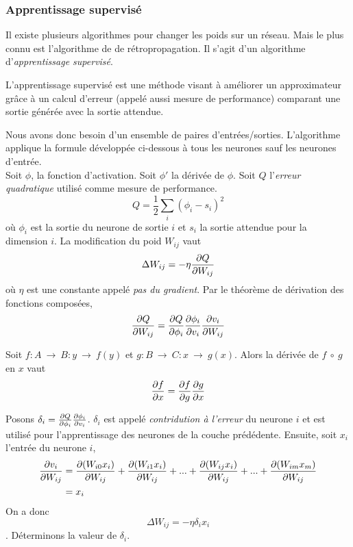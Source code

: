 \subsubsection{Apprentissage supervisé}\label{sec:appmlp}
Il existe plusieurs algorithmes pour changer les poids sur un réseau. Mais le plus connu est l'algorithme de de rétropropagation.\cite{Haykin,Gauthier}
Il s'agit d'un algorithme d'\emph{apprentissage supervisé}.
\begin{definition}
L'apprentissage supervisé est une méthode visant à améliorer un approximateur grâce à un calcul d'erreur (appelé aussi mesure de performance\cite{Gauthier}) comparant une sortie générée avec la sortie attendue.
\end{definition}
Nous avons donc besoin d'un ensemble de paires d'entrées/sorties.
L'algorithme applique la formule développée ci-dessous à tous les neurones sauf les neurones d'entrée.\\

Soit $\phi$, la fonction d'activation. Soit $\phi'$ la dérivée de $\phi$. Soit $Q$ l'\emph{erreur quadratique} utilisé comme mesure de performance.
\[Q = \frac{1}{2}\sum_{i}(\phi_i-s_i)^2\] où $\phi_i$ est la sortie du neurone de sortie $i$ et $s_i$ la sortie attendue pour la dimension $i$.
La modification du poid $W_{ij}$ vaut \[\Delta W_{ij} = -\eta\frac{\partial Q}{\partial W_{ij}}\] où $\eta$ est une constante appelé \emph{pas du gradient}.
Par le théorème de dérivation des fonctions composées, \[\frac{\partial Q}{\partial W_{ij}} = \frac{\partial Q}{\partial \phi_i} \frac{\partial \phi_i}{\partial v_i} \frac{\partial v_i}{\partial W_{ij}}\]
\begin{thm}
Soit $f:A~\rightarrow~B : y~\rightarrow~f(y)$ et $g:B~\rightarrow~C : x~\rightarrow~g(x)$. Alors la dérivée de $f~\circ~g$ en $x$ vaut
\[\frac{\partial f}{\partial x} = \frac{\partial f}{\partial g} \frac{\partial g}{\partial x}\]
\end{thm}
Posons $\delta_i = \frac{\partial Q}{\partial \phi_i} \frac{\partial \phi_i}{\partial v_i}$. $\delta_i$ est appelé \emph{contridution à l'erreur} du neurone $i$ et est utilisé pour l'apprentissage des neurones de la couche prédédente.
Ensuite, soit $x_i$ l'entrée du neurone $i$,
\begin{equation}
 \begin{split}
  \frac{\partial v_i}{\partial W_{ij}} & = \frac{\partial (W_{i0}x_i)}{\partial W_{ij}} + \frac{\partial (W_{i1}x_i)}{\partial W_{ij}} + ... + \frac{\partial (W_{ij}x_i)}{\partial W_{ij}} + ... + \frac{\partial (W_{im}x_m)}{\partial W_{ij}}\\
  ~ & = x_i
  \end{split}
\end{equation}
On a donc \[\Delta W_{ij} = -\eta \delta_i x_i\].
Déterminons la valeur de $\delta_i$.\\

